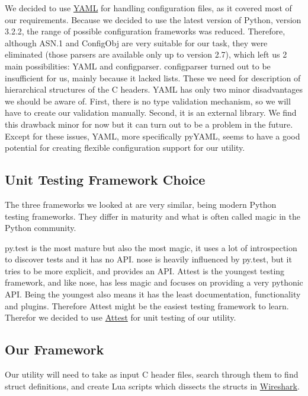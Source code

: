We decided to use \hyperref[sec:pre:yaml]{YAML} for handling configuration
files, as it covered most of our requirements. Because we decided to use the
latest version of Python, version 3.2.2, the range of possible configuration
frameworks was reduced. Therefore, although ASN.1 and ConfigObj are very
suitable for our task, they were eliminated (those parsers are available
only up to version 2.7), which left us 2 main possibilities: YAML and
configparser. configparser turned out to be insufficient for us, mainly because
it lacked lists. These we need for description of hierarchical structures of
the C headers. YAML has only two minor disadvantages we should be aware of.
First, there is no type validation mechanism, so we will have to create our
validation manually. Second, it is an external library. We find this drawback
minor for now but it can turn out to be a problem in the future. Except for
these issues, YAML, more specifically pyYAML, seems to have a good potential
for creating flexible configuration support for our utility.

\subsection{Unit Testing Framework Choice}
\label{sec:pre:testchoice}
The three frameworks we looked at  are very similar, being modern Python
testing frameworks. They differ in maturity and what is often called magic in
the Python community.

py.test is the most mature but also the most magic, it uses a lot of
introspection to discover tests and it has no API. nose is heavily influenced
by py.test, but it tries to be more explicit, and provides an API. Attest is
the youngest testing framework, and like nose, has less magic and focuses on
providing a very pythonic API. Being the youngest also means it has the least
documentation, functionality and plugins. Therefore Attest might be the easiest
testing framework to learn. Therefor we decided to use
\hyperref[sec:pre:attest]{Attest} for unit testing of our utility.

\subsection{Our Framework}
\label{sec:pre:framework}
Our utility will need to take as input C header files, search through them to
find struct definitions, and create Lua scripts which dissects the structs in
\hyperref[sec:pre:wireshark]{Wireshark}.

